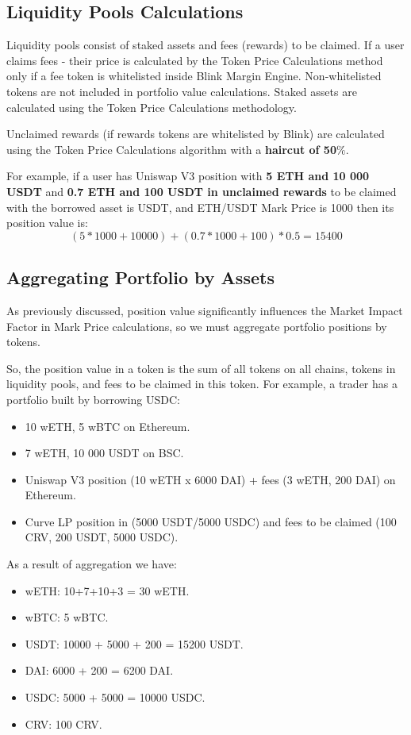 \documentclass[letterpaper, 12pt]{article}
\begin{document}
\subsection{Liquidity Pools Calculations}
Liquidity pools consist of staked assets and fees (rewards) to be claimed. If a user claims fees - their price is calculated by the Token Price Calculations method only if a fee token is whitelisted inside Blink Margin Engine. Non-whitelisted tokens are not included in portfolio value calculations.
Staked assets are calculated using the Token Price Calculations methodology. 

Unclaimed rewards (if rewards tokens are whitelisted by Blink) are calculated using the Token Price Calculations algorithm with a \textbf{haircut of 50$\%$}.

For example, if a user has Uniswap V3 position with \textbf{5 ETH and 10 000 USDT} and \textbf{0.7 ETH and 100 USDT in unclaimed rewards} to be claimed with the borrowed asset is USDT, and ETH/USDT Mark Price is 1000 then its position value is:
$$(5 * 1000 + 10000) + (0.7*1000+100)*0.5= 15400$$


\subsection{Aggregating Portfolio by Assets}
As previously discussed, position value significantly influences the Market Impact Factor in Mark Price calculations, so we must aggregate portfolio positions by tokens. 

So, the position value in a token is the sum of all tokens on all chains, tokens in liquidity pools, and fees to be claimed in this token. For example, a trader has a portfolio built by borrowing USDC:
\begin{itemize}
	\item 10 wETH, 5 wBTC on Ethereum.
	\item 7 wETH, 10 000 USDT on BSC.
	\item Uniswap V3 position (10 wETH x 6000 DAI) + fees (3 wETH, 200 DAI) on Ethereum.
	\item Curve LP position in (5000 USDT/5000 USDC) and fees to be claimed (100 CRV, 200 USDT, 5000 USDC).
\end{itemize}

As a result of aggregation we have:
\begin{itemize}
	\item wETH: 10+7+10+3 = 30 wETH.
	\item wBTC: 5 wBTC.
	\item USDT: 10000 + 5000 + 200 = 15200 USDT.
	\item DAI: 6000 + 200 = 6200 DAI.
	\item USDC: 5000 + 5000 = 10000 USDC.
	\item CRV: 100 CRV.
\end{itemize}
\end{document}
